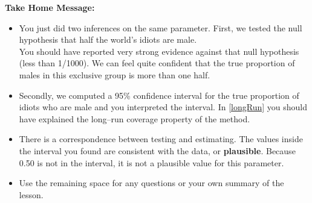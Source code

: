 \begin{center}
  {\bf Take Home Message:}
\end{center}
\begin{itemize}
  \item You just did two inferences on the same parameter.  First, we
    tested the null hypothesis that half the world's idiots are
    male.\\
      You should have reported very strong evidence against that null
      hypothesis (less than 1/1000). We can feel quite confident that
      the true proportion 
      of males in this exclusive group is more than one half.

  \item Secondly, we computed a 95\% confidence interval for the true
    proportion of idiots who are male and you interpreted the
    interval.  In \ref{longRun} you should have explained the
    long--run coverage property of the method.
  \item   There is a correspondence
    between testing and estimating.  The values inside the interval
    you found are consistent with the data, or {\bf plausible}.  Because
    0.50 is not in the interval, it is not a plausible value for this
    parameter. 
 \item 
  Use the remaining space for any questions or your own summary of the
  lesson. 

\end{itemize}

